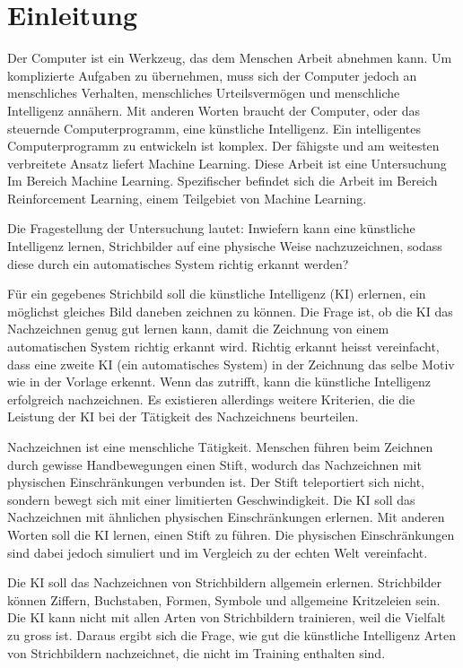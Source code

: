 \chapter{Einleitung}\label{chap:einleit}
Der Computer ist ein Werkzeug, das dem Menschen Arbeit abnehmen kann. Um
komplizierte Aufgaben zu übernehmen, muss sich der Computer jedoch an
menschliches Verhalten, menschliches Urteilsvermögen und menschliche Intelligenz
annähern. Mit anderen Worten braucht der Computer, oder das steuernde
Computerprogramm, eine künstliche Intelligenz. Ein intelligentes
Computerprogramm zu entwickeln ist komplex. Der fähigste und am weitesten
verbreitete Ansatz liefert Machine Learning. Diese Arbeit ist eine Untersuchung
Im Bereich Machine Learning. Spezifischer befindet sich die Arbeit im Bereich
Reinforcement Learning, einem Teilgebiet von Machine Learning.

Die Fragestellung der Untersuchung lautet: Inwiefern kann eine künstliche
Intelligenz lernen, Strichbilder auf eine physische Weise nachzuzeichnen, sodass
diese durch ein automatisches System richtig erkannt werden?

Für ein gegebenes Strichbild soll die künstliche Intelligenz (KI) erlernen, ein
möglichst gleiches Bild daneben zeichnen zu können. Die Frage ist, ob die KI das
Nachzeichnen genug gut lernen kann, damit die Zeichnung von einem automatischen
System richtig erkannt wird. Richtig erkannt heisst vereinfacht,
dass eine zweite KI (ein automatisches System) in der Zeichnung das selbe Motiv wie in der Vorlage erkennt.
Wenn das zutrifft, kann die künstliche Intelligenz erfolgreich nachzeichnen. Es
existieren allerdings weitere Kriterien, die die Leistung der KI bei der
Tätigkeit des Nachzeichnens beurteilen.

Nachzeichnen ist eine menschliche Tätigkeit. Menschen führen beim Zeichnen durch
gewisse Handbewegungen einen Stift, wodurch das Nachzeichnen mit physischen
Einschränkungen verbunden ist. Der Stift teleportiert sich nicht, sondern bewegt
sich mit einer limitierten Geschwindigkeit. Die KI soll das Nachzeichnen mit
ähnlichen physischen Einschränkungen erlernen. Mit anderen Worten soll die KI
lernen, einen Stift zu führen. Die physischen Einschränkungen sind dabei jedoch
simuliert und im Vergleich zu der echten Welt vereinfacht. 

Die KI soll das Nachzeichnen von Strichbildern allgemein erlernen. Strichbilder
können Ziffern, Buchstaben, Formen, Symbole und allgemeine Kritzeleien sein. Die
KI kann nicht mit allen Arten von Strichbildern trainieren, weil die Vielfalt zu
gross ist. Daraus ergibt sich die Frage, wie gut die künstliche Intelligenz
Arten von Strichbildern nachzeichnet, die nicht im Training enthalten sind.

